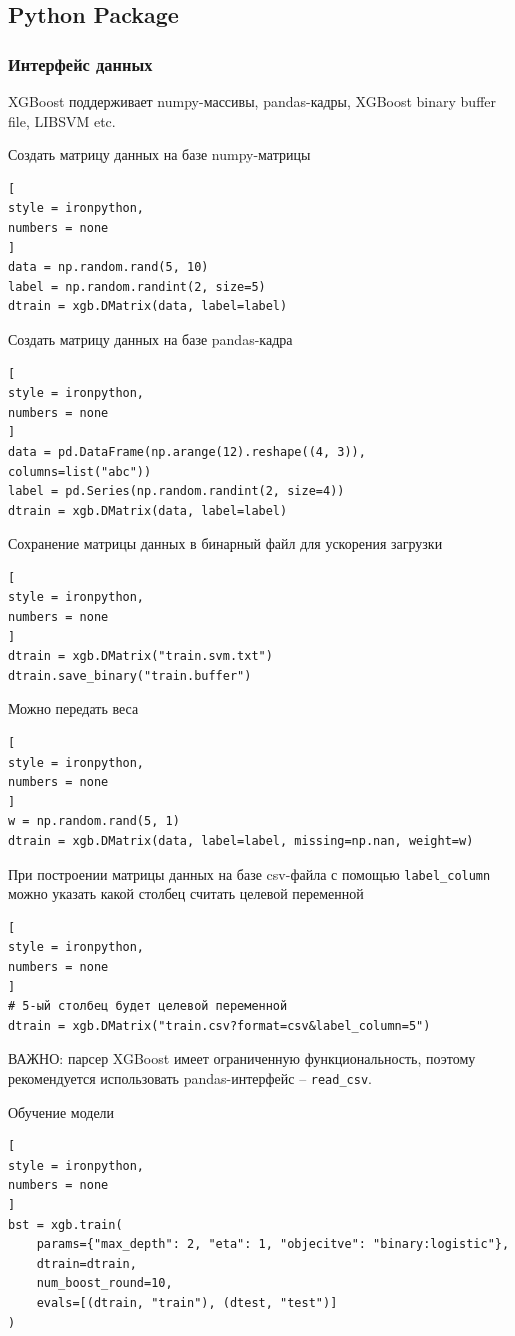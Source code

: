 \documentclass[%
	11pt,
	a4paper,
	utf8,
		]{article}
\begin{document}
\subsection{Python Package}

\subsubsection{Интерфейс данных}

XGBoost поддерживает numpy-массивы, pandas-кадры, XGBoost binary buffer file, LIBSVM etc.

Создать матрицу данных на базе numpy-матрицы
\begin{lstlisting}[
style = ironpython,
numbers = none
]
data = np.random.rand(5, 10)
label = np.random.randint(2, size=5)
dtrain = xgb.DMatrix(data, label=label)
\end{lstlisting}

Создать матрицу данных на базе pandas-кадра 
\begin{lstlisting}[
style = ironpython,
numbers = none
]
data = pd.DataFrame(np.arange(12).reshape((4, 3)), columns=list("abc"))
label = pd.Series(np.random.randint(2, size=4))
dtrain = xgb.DMatrix(data, label=label)
\end{lstlisting}

Сохранение матрицы данных в бинарный файл для ускорения загрузки
\begin{lstlisting}[
style = ironpython,
numbers = none
]
dtrain = xgb.DMatrix("train.svm.txt")
dtrain.save_binary("train.buffer")
\end{lstlisting}

Можно передать веса
\begin{lstlisting}[
style = ironpython,
numbers = none
]
w = np.random.rand(5, 1)
dtrain = xgb.DMatrix(data, label=label, missing=np.nan, weight=w)
\end{lstlisting}

При построении матрицы данных на базе csv-файла с помощью \verb|label_column| можно указать какой столбец считать целевой переменной
\begin{lstlisting}[
style = ironpython,
numbers = none
]
# 5-ый столбец будет целевой переменной
dtrain = xgb.DMatrix("train.csv?format=csv&label_column=5")
\end{lstlisting}

ВАЖНО: парсер XGBoost имеет ограниченную функциональность, поэтому рекомендуется использовать pandas-интерфейс -- \verb|read_csv|.

Обучение модели 
\begin{lstlisting}[
style = ironpython,
numbers = none
]
bst = xgb.train(
    params={"max_depth": 2, "eta": 1, "objecitve": "binary:logistic"},
    dtrain=dtrain,
    num_boost_round=10,
    evals=[(dtrain, "train"), (dtest, "test")]
)
\end{lstlisting}
\end{document}
